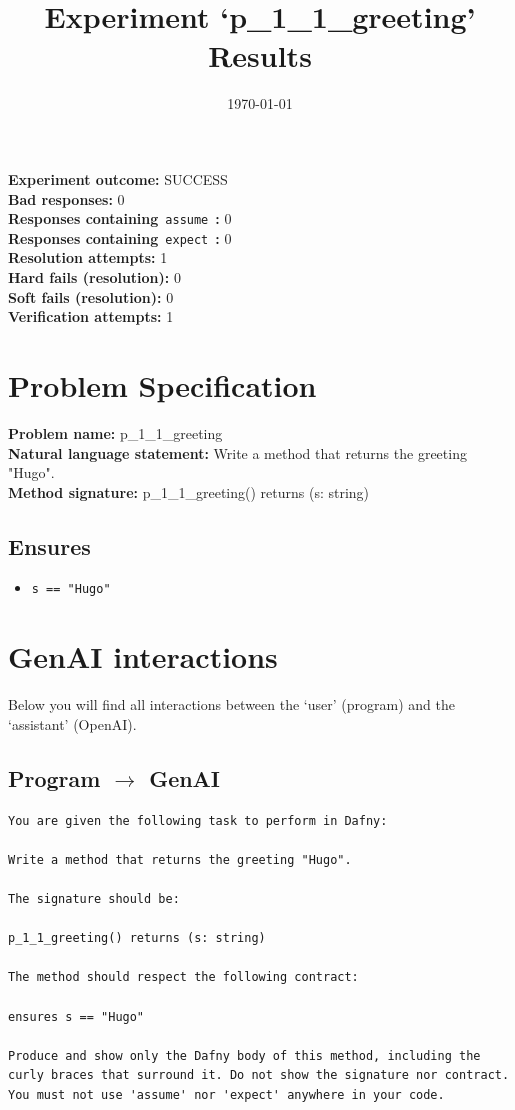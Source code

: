 \documentclass{article}
\begin{document}
\title{Experiment `p\_1\_1\_greeting' Results}
\author{\today}
\date{}
\maketitle
\textbf{Experiment outcome: }SUCCESS
\\\textbf{Bad responses: }0
\\\textbf{Responses containing}~\texttt{assume}~\textbf{: }0
\\\textbf{Responses containing}~\texttt{expect}~\textbf{: }0
\\\textbf{Resolution attempts: }1
\\\textbf{Hard fails (resolution): }0
\\\textbf{Soft fails (resolution): }0
\\\textbf{Verification attempts: }1
\section*{Problem Specification}
\textbf{Problem name: }p\_1\_1\_greeting
\\\textbf{Natural language statement: }Write a method that returns the greeting "Hugo".
\\\textbf{Method signature: }p\_1\_1\_greeting() returns (s: string)
\subsection*{Ensures}
\begin{itemize}
\item \texttt{s == "Hugo"}
\end{itemize}
\clearpage
\section*{GenAI interactions}
Below you will find all interactions between the `user' (program) and the `assistant' (OpenAI).
\subsection*{Program $\rightarrow$ GenAI}
\begin{lstlisting}
You are given the following task to perform in Dafny:

Write a method that returns the greeting "Hugo".

The signature should be:

p_1_1_greeting() returns (s: string)

The method should respect the following contract:

ensures s == "Hugo"

Produce and show only the Dafny body of this method, including the curly braces that surround it. Do not show the signature nor contract. You must not use 'assume' nor 'expect' anywhere in your code.
\end{lstlisting}
\end{document}
